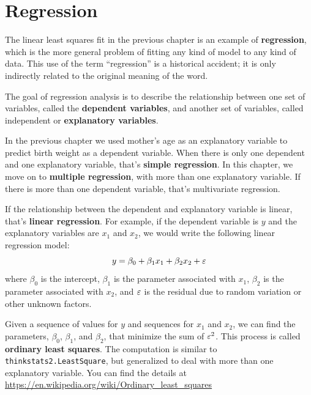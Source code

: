 \documentclass[12pt]{book}
\begin{document}
\chapter{Regression}
\label{regression}

The linear least squares fit in the previous chapter is an example of
{\bf regression}, which is the more general problem of fitting any
kind of model to any kind of data.  This use of the term ``regression''
is a historical accident; it is only indirectly related to the
original meaning of the word.

The goal of regression analysis is to describe the relationship
between one set of variables, called the {\bf dependent variables},
and another set of variables, called independent or {\bf
  explanatory variables}.

In the previous chapter we used mother's age as an explanatory
variable to predict birth weight as a dependent variable.  When there
is only one dependent and one explanatory variable, that's {\bf
  simple regression}.  In this chapter, we move on to {\bf multiple
  regression}, with more than one explanatory variable.  If there is
more than one dependent variable, that's multivariate
regression.

If the relationship between the dependent and explanatory variable
is linear, that's {\bf linear regression}.  For example,
if the dependent variable is $y$ and the explanatory variables
are $x_1$ and $x_2$, we would write the following linear
regression model:
%
\[ y = \beta_0 + \beta_1 x_1 + \beta_2 x_2 + \varepsilon \]
%
where $\beta_0$ is the intercept, $\beta_1$ is the parameter
associated with $x_1$, $\beta_2$ is the parameter associated with
$x_2$, and $\varepsilon$ is the residual due to random variation or other
unknown factors.

Given a sequence of values for $y$ and sequences for $x_1$ and $x_2$,
we can find the parameters, $\beta_0$, $\beta_1$, and $\beta_2$, that
minimize the sum of $\varepsilon^2$.  This process is called
{\bf ordinary least squares}.  The computation is similar to
\verb"thinkstats2.LeastSquare", but generalized to deal with more than one
explanatory variable.  You can find the details at
\url{https://en.wikipedia.org/wiki/Ordinary_least_squares}
\end{document}
